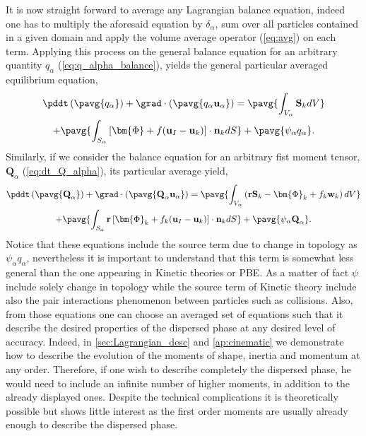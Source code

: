 It is now straight forward to average any Lagrangian balance equation, indeed one has to multiply the aforesaid equation by $\delta_\alpha$, sum over all particles contained in a given domain and apply the volume average operator (\ref{eq:avg}) on each term. 
Applying this process on the general balance equation for an arbitrary quantity $q_\alpha$ (\ref{eq:q_alpha_balance}), yields the general particular averaged equilibrium equation,
\begin{multline}
    \pddt   \left(\pavg{q_\alpha}\right)
    + \grad \cdot \left(\pavg{q_\alpha \textbf{u}_\alpha}\right) 
    = \pavg{\int_{V_\alpha} \textbf{S}_k dV}\\
    + \pavg{\int_{S_\alpha} \left[\bm{\Phi} + f (\textbf{u}_I-\textbf{u}_k) \right] \cdot \textbf{n}_k d S}
    + \pavg{\psi_\alpha q_\alpha}
    .\label{eq:q_avg_p_global}
\end{multline}
Similarly, if we consider the balance equation for an arbitrary fist moment tensor, $\textbf{Q}_\alpha$ (\ref{eq:dt_Q_alpha}), its particular average yield,  
\begin{multline}
    \pddt   \left(\pavg{\textbf{Q}_\alpha}\right)
    + \grad \cdot \left(\pavg{\textbf{Q}_\alpha \textbf{u}_\alpha}\right) 
    = \pavg{\int_{V_\alpha} \left( 
        \textbf{r} \textbf{S}_k 
        - \bm{\Phi}_k
        + f_k  \textbf{w}_k 
    \right) dV}\\
    + \pavg{\int_{S_\alpha} \textbf{r} \left[
        \bm{\Phi}_k
        + f_k (\textbf{u}_I-\textbf{u}_k)
    \right]\cdot \textbf{n}_k  dS}
    + \pavg{\psi_\alpha \textbf{Q}_\alpha}
    .\label{eq:dt_avg_Q_alpha}
\end{multline}
Notice that these equations include the source term due to change in topology as $\psi_\alpha q_\alpha$, nevertheless it is important to understand that this term is somewhat less general than the one appearing in Kinetic theories or PBE. 
As a matter of fact $\psi$ include solely change in topology while the source term of Kinetic theory include also the pair interactions phenomenon between particles such as collisions. 
Also, from those equations one can choose an averaged set of equations such that it describe the desired properties of the dispersed phase at any desired level of accuracy.
Indeed, in \ref{sec:Lagrangian_desc} and \ref{ap:cinematic} we demonstrate how to describe the evolution of the moments of shape, inertia and momentum at any order.
Therefore, if one wish to describe completely the dispersed phase, he would need to include an infinite number of higher moments, in addition to the already displayed ones. 
Despite the technical complications it is theoretically possible but shows little interest as the first order moments are usually already enough to describe the dispersed phase.  

